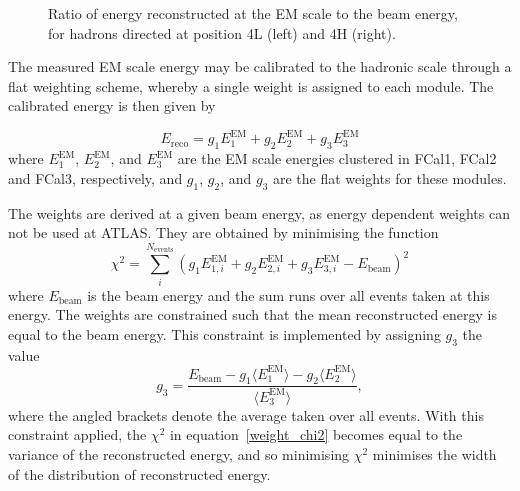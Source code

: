 \begin{figure}[!htb]
\begin{centering}
\caption{Ratio of energy reconstructed at the EM scale to the beam energy, for hadrons directed at position 4L (left) and 4H (right).} 
\label{hadron_linearity_EMc16}
\end{centering}
\end{figure}




The measured EM scale energy may be calibrated to the hadronic scale through a flat weighting scheme, whereby a single weight is assigned to each module. The calibrated energy is then given by 

\begin{equation}
E_\mathrm{reco} = g_1 E_1^\mathrm{EM} +  g_2 E_2^\mathrm{EM} +  g_3 E_3^\mathrm{EM}
\end{equation}
 where $E_1^\mathrm{EM}$, $E_2^\mathrm{EM}$, and $E_3^\mathrm{EM}$ are the EM scale energies clustered in FCal1, FCal2 and FCal3, respectively,  and $g_1$, $g_2$, and $g_3$ are the flat weights for these modules.
 
 
 
The weights are derived at a given beam energy, as energy dependent weights can not be used at ATLAS. They are obtained by minimising the function
\begin{equation}
\chi^2 = \sum_i^{N_\mathrm{events}}\left( g_1 E_{1,i}^\mathrm{EM} +  g_2 E_{2,i}^\mathrm{EM} +  g_3 E_{3,i}^\mathrm{EM} - E_\mathrm{beam} \right )^2
\label{weight_chi2}
\end{equation}
where $E_\mathrm{beam}$ is the beam energy and the sum  runs over all events taken at this energy. The weights are constrained such that the mean reconstructed energy is equal to the beam energy. This constraint is implemented by assigning $g_3$ the value
\begin{equation}
\label{hadronic_weight_constraint}
g_3 = \frac{ E_\mathrm{beam}  - g_1 \langle E_{1}^\mathrm{EM}\rangle - g_2 \langle E_{2}^\mathrm{EM}\rangle }{\langle E_{3}^\mathrm{EM}\rangle},
\end{equation}
where the angled brackets denote the average taken over all events. With this constraint applied, the $\chi^2$ in equation~\ref{weight_chi2} becomes equal to the variance of the reconstructed energy, and so minimising $\chi^2$ minimises the width of the distribution of reconstructed energy.


